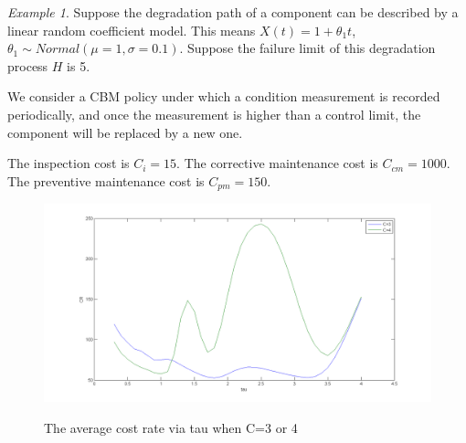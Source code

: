\documentclass[10pt,a4paper]{article}
\theoremstyle{remark}
\newtheorem{example}{Example}
\begin{document}
\begin{example} \label{ex:degradation2} \renewcommand{\qedsymbol}{$\lozenge$} \mbox{}
Suppose the degradation path of a component can be described by a linear random coefficient model. This means $X(t)=1+\theta_1t$, $\theta_1 \sim Normal(\mu=1,\sigma=0.1)$. Suppose the failure limit of this degradation process $H$ is 5.

We consider a CBM policy under which a condition measurement is recorded periodically, and once the measurement is higher than a control limit, the component will be replaced by a new one.

The inspection cost is $C_i=15$. The corrective maintenance cost is $C_{cm}=1000$. The preventive maintenance cost is $C_{pm}=150$.

\begin{figure}  
  \centering
  \includegraphics[width=6in]{example41.png}\\
  \footnotesize
  \caption{ \footnotesize{The average cost rate via tau when C=3 or 4} }\label{pic:example4.1}
\end{figure}
%
%



\end{example}
\end{document}
